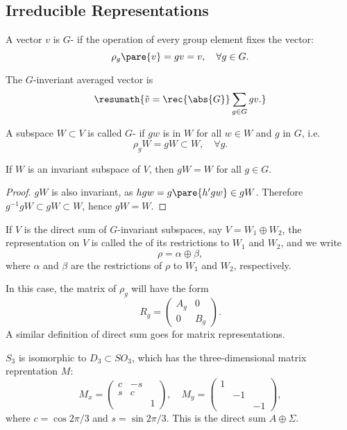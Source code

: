 \documentclass[hidelinks]{article}
\let\oldgloss\gloss
\def\gloss#1{\textnormal{\textbf{\oldgloss{#1}}}}
\begin{document}

\subsection{Irreducible Representations} %
\label{sub:irreducible_representations}

\begin{definition}
    A vector $v$ is $G$- if the operation of every group element fixes the vector:
    \[ \rho_g\pare{v} = gv = v,\quad \forall g\in G. \]
\end{definition}
The $G$-inveriant averaged vector is
\[ \resumath{\tilde{v} = \rec{\abs{G}}\sum_{g\in G}gv.} \]
\begin{definition}
    A subspace $W\subset V$ is called $G$- if $gw$ is in $W$ for all $w\in W$ and $g$ in $G$, i.e.
    \[ \rho_g W = gW \subset W,\quad \forall g. \]
\end{definition}
\begin{lemma}
    If $W$ is an invariant subspace of $V$, then $gW = W$ for all $g\in G$.
\end{lemma}
\begin{proof}
    $gW$ is also invariant, as $hgw = g\pare{h'gw} \in gW$. Therefore $g^{-1}gW \subset gW \subset W$, hence $gW = W$.
\end{proof}
\begin{definition}
    If $V$ is the direct sum of $G$-invariant subspaces, say $V = W_1 \oplus W_2$, the representation on $V$ is called the  of its restrictions to $W_1$ and $W_2$, and we write
    \[ \rho = \alpha \oplus \beta, \]
    where $\alpha$ and $\beta$ are the restrictions of $\rho$ to $W_1$ and $W_2$, respectively.
\end{definition}
In this case, the matrix of $\rho_g$ will have the form
\[ R_g = \begin{pmatrix}
    A_g & 0 \\
    0 & B_g
\end{pmatrix}. \]
A similar definition of direct sum goes for matrix representations.
\begin{ex}
    $S_3$ is isomorphic to $D_3 \subset SO_3$, which has the three-dimensional matrix reprentation $M$:
    \[ M_x = \begin{pmatrix}
        c & -s \\
        s & c \\
        & & 1
    \end{pmatrix},\quad M_y = \begin{pmatrix}
        1 \\ & -1  \\ & & -1
    \end{pmatrix}, \]
    where $c = \cos 2\pi/3$ and $s = \sin 2\pi/3$. This is the direct sum $A\oplus \Sigma$.
\end{ex}
\end{document}
